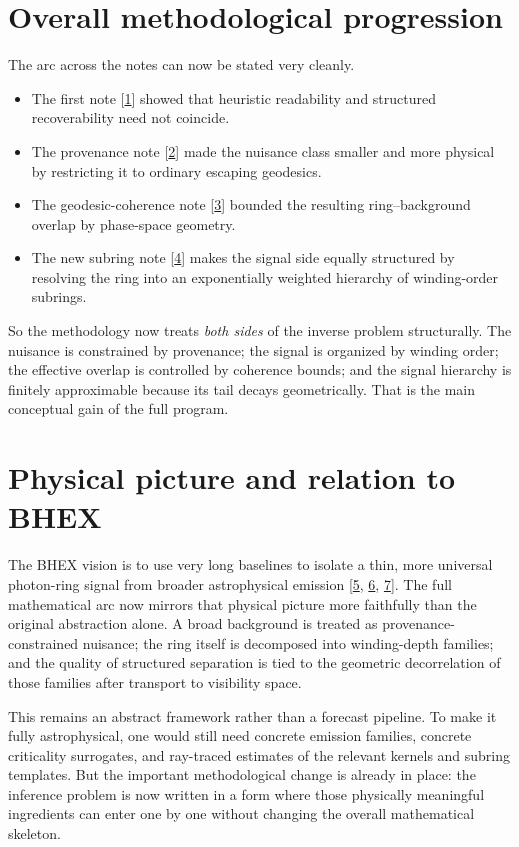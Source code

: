 \documentclass[10pt,letterpaper,twocolumn]{article}
\providecommand{\tightlist}{%
  \setlength{\itemsep}{0pt}\setlength{\parskip}{0pt}}
\begin{document}
\section{Overall methodological progression}

The arc across the notes can now be stated very cleanly.

\begin{itemize}
\tightlist
\item The first note [\hyperlink{ref-1}{1}] showed that heuristic readability and structured recoverability need not coincide.
\item The provenance note [\hyperlink{ref-2}{2}] made the nuisance class smaller and more physical by restricting it to ordinary escaping geodesics.
\item The geodesic-coherence note [\hyperlink{ref-3}{3}] bounded the resulting ring--background overlap by phase-space geometry.
\item The new subring note [\hyperlink{ref-4}{4}] makes the signal side equally structured by resolving the ring into an exponentially weighted hierarchy of winding-order subrings.
\end{itemize}

So the methodology now treats \emph{both sides} of the inverse problem structurally. The nuisance is constrained by provenance; the signal is organized by winding order; the effective overlap is controlled by coherence bounds; and the signal hierarchy is finitely approximable because its tail decays geometrically. That is the main conceptual gain of the full program.

\section{Physical picture and relation to BHEX}

The BHEX vision is to use very long baselines to isolate a thin, more universal photon-ring signal from broader astrophysical emission [\hyperlink{ref-5}{5}, \hyperlink{ref-6}{6}, \hyperlink{ref-7}{7}]. The full mathematical arc now mirrors that physical picture more faithfully than the original abstraction alone. A broad background is treated as provenance-constrained nuisance; the ring itself is decomposed into winding-depth families; and the quality of structured separation is tied to the geometric decorrelation of those families after transport to visibility space.

This remains an abstract framework rather than a forecast pipeline. To make it fully astrophysical, one would still need concrete emission families, concrete criticality surrogates, and ray-traced estimates of the relevant kernels and subring templates. But the important methodological change is already in place: the inference problem is now written in a form where those physically meaningful ingredients can enter one by one without changing the overall mathematical skeleton.
\end{document}
